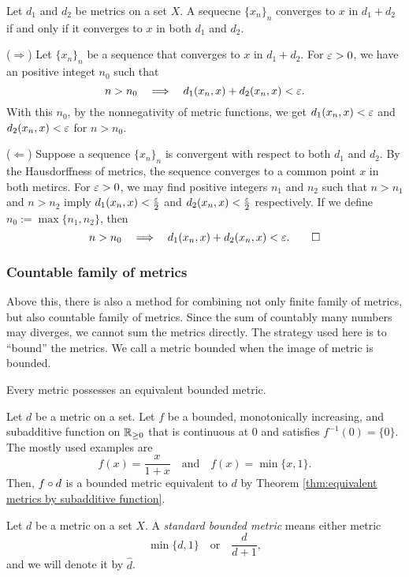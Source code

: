 \begin{prop}\label{prop:summed metric convergence}
Let $d_1$ and $d_2$ be metrics on a set $X$.
A sequecne $\{x_n\}_n$ converges to $x$ in $d_1+d_2$ if and only if it converges to $x$ in both $d_1$ and $d_2$.
\end{prop}
\begin{pf}
($\Rightarrow$)
Let $\{x_n\}_n$ be a sequence that converges to $x$ in $d_1+d_2$.
For $\varepsilon>0$, we have an positive integet $n_0$ such that
\[n>n_0\impl d_1(x_n,x)+d_2(x_n,x)<\e.\]
With this $n_0$, by the nonnegativity of metric functions, we get $d_1(x_n,x)<\varepsilon$ and $d_2(x_n,x)<\varepsilon$ for $n>n_0$.

($\Leftarrow$)
Suppose a sequence $\{x_n\}_n$ is convergent with respect to both $d_1$ and $d_2$.
By the Hausdorffness of metrics, the sequence converges to a common point $x$ in both metircs.
For $\varepsilon>0$, we may find positive integers $n_1$ and $n_2$ such that $n>n_1$ and $n>n_2$ imply $d_1(x_n,x)<\frac{\varepsilon}2$ and $d_2(x_n,x)<\frac{\varepsilon}2$ respectively.
If we define $n_0:=\max\{n_1,n_2\}$, then
\[n>n_0\impl d_1(x_n,x)+d_2(x_n,x)<\e.\qedhere\]
\end{pf}


\subsubsection{Countable family of metrics}
Above this, there is also a method for combining not only finite family of metrics, but also countable family of metrics.
Since the sum of countably many numbers may diverges, we cannot sum the metrics directly.
The strategy used here is to ``bound'' the metrics.
We call a metric bounded when the image of metric is bounded.

\begin{prop}
Every metric possesses an equivalent bounded metric.
\end{prop}
\begin{pf}
Let $d$ be a metric on a set.
Let $f$ be a bounded, monotonically increasing, and subadditive function on $\mathbb{R}_{\ge0}$ that is continuous at 0 and satisfies $f^{-1}(0)=\{0\}$.
The mostly used examples are
\[f(x)=\frac x{1+x}\quad\text{and}\quad f(x)=\min\{x,1\}.\]
Then, $f\o d$ is a bounded metric equivalent to $d$ by Theorem \ref{thm:equivalent metrics by subadditive function}.
\end{pf}

\begin{defn}
Let $d$ be a metric on a set $X$.
A \emph{standard bounded metric} means either metric
\[\min\{d,1\}\quad\text{or}\quad\frac d{d+1},\]
and we will denote it by $\hat d$.
\end{defn}

